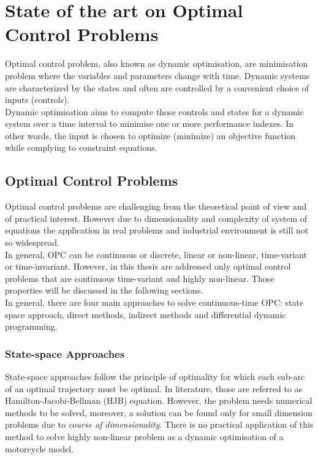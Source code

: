 \section{State of the art on Optimal Control Problems} 
%
Optimal control problem, also known as dynamic optimisation, are minimisation problem where the variables and parameters change with time. Dynamic systems are characterized by the states and often are controlled by a convenient choice of inputs (controls).\\
Dynamic optimisation aims to compute those controls and states for a dynamic system over a time interval to minimise one or more performance indexes. In other words, the input is chosen to optimize (minimize) an objective function while complying to constraint equations.
%
\subsection{Optimal Control Problems}
Optimal control problems are challenging from the theoretical point of view and of practical interest. However due to dimensionality and complexity of system of equations the application in real problems and industrial environment is still not so widespread.\\
In general, OPC can be continuous or discrete, linear or non-linear, time-variant or time-invariant. However, in this thesis are addressed only optimal control problems that are continuous time-variant and highly non-linear. Those properties will be discussed in the following sections.\\
In general, there are four main approaches to solve continuous-time OPC: state space approach, direct methods, indirect methods and differential dynamic programming.
%
\subsubsection{State-space Approaches}
%
State-space approaches follow the principle of optimality for which each sub-arc of an optimal trajectory must be optimal. In literature, those are referred to as Hamilton-Jacobi-Bellman (HJB) equation. However, the problem needs numerical methods to be solved, moreover, a solution can be found only for small dimension problems due to \textit{course of dimensionality}. There is no practical application of this method to solve highly non-linear problem as a dynamic optimisation of a motorcycle model.
%
